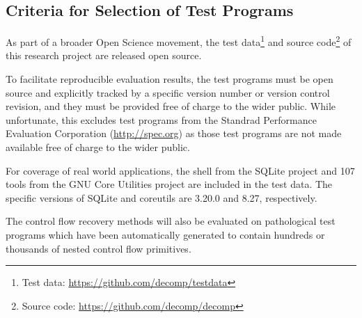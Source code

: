 
\subsection{Criteria for Selection of Test Programs}

As part of a broader Open Science movement, the test data\footnote{Test data: \url{https://github.com/decomp/testdata}} and source code\footnote{Source code: \url{https://github.com/decomp/decomp}} of this research project are released open source.

To facilitate reproducible evaluation results, the test programs must be open source and explicitly tracked by a specific version number or version control revision, and they must be provided free of charge to the wider public. While unfortunate, this excludes test programs from the Standrad Performance Evaluation Corporation (\url{http://spec.org}) as those test programs are not made available free of charge to the wider public.


For coverage of real world applications, the shell from the SQLite project and 107 tools from the GNU Core Utilities project are included in the test data. The specific versions of SQLite and coreutils are 3.20.0 and 8.27, respectively.

The control flow recovery methods will also be evaluated on pathological test programs which have been automatically generated to contain hundreds or thousands of nested control flow primitives.

